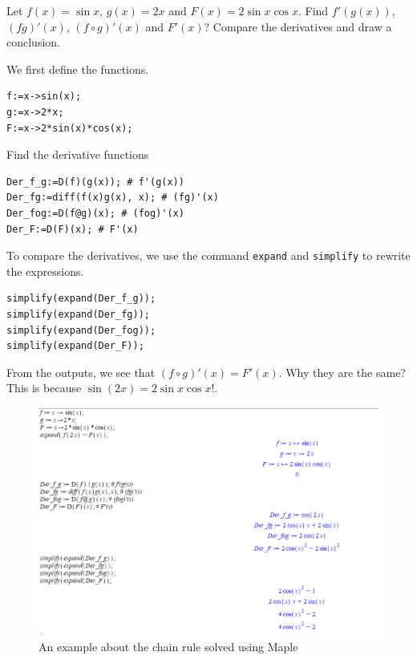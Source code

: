 \documentclass[]{book}
\theoremstyle{definition}
\theoremstyle{definition}
\theoremstyle{definition}
\theoremstyle{remark}
\let\BeginKnitrBlock\begin \let\EndKnitrBlock\end
\begin{document}
\BeginKnitrBlock{example}
\protect\hypertarget{exm:unnamed-chunk-14}{}{\label{exm:unnamed-chunk-14} }
Let \(f(x)=\sin x\), \(g(x)=2x\) and \(F(x)=2\sin x\cos x\). Find \(f'(g(x))\), \((fg)'(x)\), \((f\circ g)'(x)\) and \(F'(x)\)?
Compare the derivatives and draw a conclusion.
\EndKnitrBlock{example}

\BeginKnitrBlock{solution}
{}
We first define the functions.

\begin{verbatim}
f:=x->sin(x);
g:=x->2*x;
F:=x->2*sin(x)*cos(x);
\end{verbatim}

Find the derivative functions

\begin{verbatim}
Der_f_g:=D(f)(g(x)); # f'(g(x))
Der_fg:=diff(f(x)g(x), x); # (fg)'(x)
Der_fog:=D(f@g)(x); # (fog)'(x)
Der_F:=D(F)(x); # F'(x)
\end{verbatim}

To compare the derivatives, we use the command \texttt{expand} and \texttt{simplify} to rewrite the expressions.

\begin{verbatim}
simplify(expand(Der_f_g));
simplify(expand(Der_fg));
simplify(expand(Der_fog));
simplify(expand(Der_F));
\end{verbatim}

From the outputs, we see that \((f\circ g)'(x)=F'(x)\). Why they are the same? This is because \(\sin(2x)=2\sin x\cos x\)!.

\begin{figure}
\centering
\includegraphics{figs/chain_rule.png}
\caption{An example about the chain rule solved using Maple}
\end{figure}
\EndKnitrBlock{solution}
\end{document}
